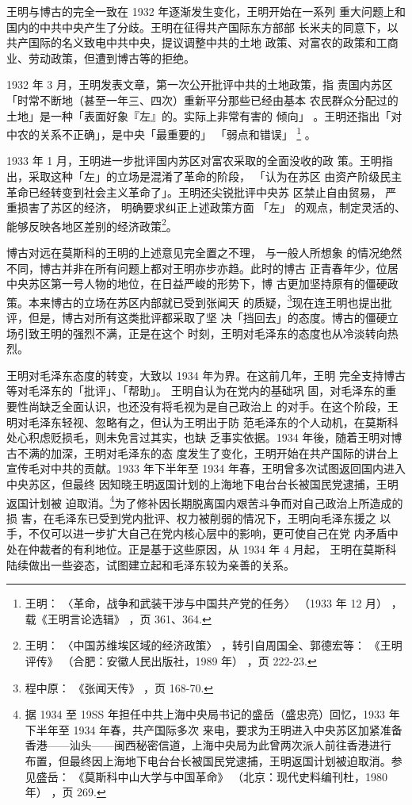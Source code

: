 王明与博古的完全一致在 1932 年逐渐发生变化，王明开始在一系列
重大问题上和国内的中共中央产生了分歧。王明在征得共产国际东方部部
长米夫的同意下，以共产国际的名义致电中共中央，提议调整中共的土地
政策、对富农的政策和工商业、劳动政策，但遭到博古等的拒绝。

1932 年 3 月，王明发表文章，第一次公开批评中共的土地政策，指
责国内苏区「时常不断地（甚至一年三、四次）重新平分那些已经由基本
农民群众分配过的土地」是一种「表面好象『左』的。实际上非常有害的
倾向」 。王明还指出「对中农的关系不正确」，是中央「最重要的」
「弱点和错误」 \footnote{王明：
〈革命，战争和武装干涉与中国共产党的任务〉
（1933 年 12 月）
，载《王明言论选辑》
，页 361、364.} 。

1933 年 1 月，王明进一步批评国内苏区对富农采取的全面没收的政
策。王明指出，采取这种「左」的立场是混淆了革命的阶段，
「认为在苏区
由资产阶级民主革命已经转变到社会主义革命了」。王明还尖锐批评中央苏
区禁止自由贸易，
严重损害了苏区的经济，
明确要求纠正上述政策方面
「左」
的观点，制定灵活的、能够反映各地区差别的经济政策\footnote{王明：
〈中国苏维埃区域的经济政策〉
，转引自周国全、郭德宏等：
《王明评传》
（合肥：安徽人民出版社，1989
年）
，页 222-23.}。

博古对远在莫斯科的王明的上述意见完全置之不理，
与一般人所想象
的情况绝然不同，博古并非在所有问题上都对王明亦步亦趋。此时的博古
正青春年少，位居中央苏区第一号人物的地位，在日益严峻的形势下，博
古更加坚持原有的僵硬政策。本来博古的立场在苏区内部就已受到张闻天
的质疑，\footnote{程中原：
《张闻天传》
，页 168-70.}现在连王明也提出批评，但是，博古对所有这类批评都采取了坚
决「挡回去」的态度。博古的僵硬立场引致王明的强烈不满，正是在这个
时刻，王明对毛泽东的态度也从冷淡转向热烈。

王明对毛泽东态度的转变，大致以 1934 年为界。在这前几年，王明
完全支持博古等对毛泽东的「批评」、「帮助」。
王明自认为在党内的基础巩
固，对毛泽东的重要性尚缺乏全面认识，也还没有将毛视为是自己政治上
的对手。在这个阶段，王明对毛泽东轻视、忽略有之，但认为王明出于防
范毛泽东的个人动机，在莫斯科处心积虑贬损毛，则未免言过其实，也缺
乏事实依据。1934 年後，随着王明对博古不满的加深，王明对毛泽东的态
度发生了变化，王明开始在共产国际的讲台上宣传毛对中共的贡献。1933
年下半年至 1934 年春，王明曾多次试图返回国内进入中央苏区，但最终
因知晓王明返国计划的上海地下电台台长被国民党逮捕，王明返国计划被
迫取消。\footnote{据 1934 至 19SS 年担任中共上海中央局书记的盛岳（盛忠亮）回忆，1933 年下半年至 1934 年春，共产国际多次
来电，要求为王明进入中央苏区加紧准备香港——汕头——闽西秘密信道，上海中央局为此曾两次派人前往香港进行
布置，但最终因上海地下电台台长被国民党逮捕，王明返国计划被迫取消。参见盛岳：
《莫斯科中山大学与中国革命》
（北京：现代史料编刊杜，1980 年）
，页 269.}为了修补因长期脱离国内艰苦斗争而对自己政治上所造成的损
害，在毛泽东已受到党内批评、权力被削弱的情况下，王明向毛泽东援之
以手，不仅可以进一步扩大自己在党内核心层中的影响，更可使自己在党
内矛盾中处在仲裁者的有利地位。正是基于这些原因，从 1934 年 4 月起，
王明在莫斯科陆续做出一些姿态，试图建立起和毛泽东较为亲善的关系。

